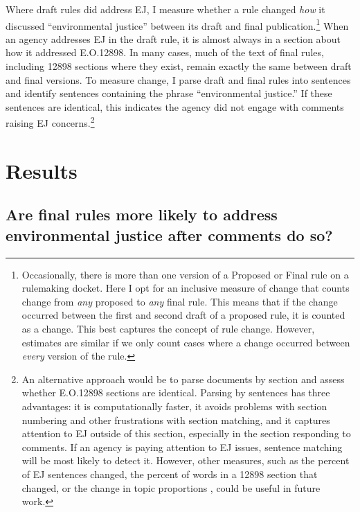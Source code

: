 \documentclass[
      12pt,
        ]{article}
\begin{document}
Where draft rules did address EJ, I measure whether a rule changed \emph{how} it discussed ``environmental justice'' between its draft and final publication.\footnote{Occasionally, there is more than one version of a Proposed or Final rule on a rulemaking docket. Here I opt for an inclusive measure of change that counts change from \emph{any} proposed to \emph{any} final rule. This means that if the change occurred between the first and second draft of a proposed rule, it is counted as a change. This best captures the concept of rule change. However, estimates are similar if we only count cases where a change occurred between \emph{every} version of the rule.}
When an agency addresses EJ in the draft rule, it is almost always in a section about how it addressed E.O.12898. In many cases, much of the text of final rules, including 12898 sections where they exist, remain exactly the same between draft and final versions.
To measure change, I parse draft and final rules into sentences and identify sentences containing the phrase ``environmental justice.'' If these sentences are identical, this indicates the agency did not engage with comments raising EJ concerns.\footnote{An alternative approach would be to parse documents by section and assess whether E.O.12898 sections are identical. Parsing by sentences has three advantages: it is computationally faster, it avoids problems with section numbering and other frustrations with section matching, and it captures attention to EJ outside of this section, especially in the section responding to comments. If an agency is paying attention to EJ issues, sentence matching will be most likely to detect it. However, other measures, such as the percent of EJ sentences changed, the percent of words in a 12898 section that changed, or the change in topic proportions \citep{Judge-Lord2017}, could be useful in future work.}

\hypertarget{results}{%
\section{Results}\label{results}}

\hypertarget{are-final-rules-more-likely-to-address-environmental-justice-after-comments-do-so}{%
\subsection{Are final rules more likely to address environmental justice after comments do so?}\label{are-final-rules-more-likely-to-address-environmental-justice-after-comments-do-so}}
\end{document}
